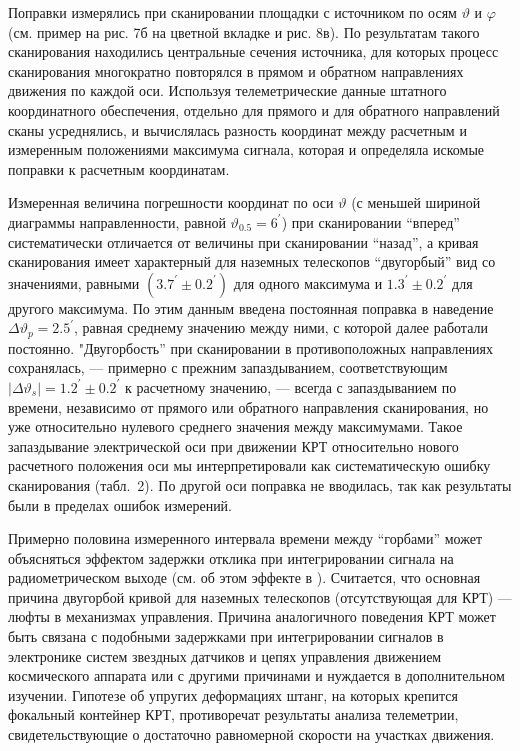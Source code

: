 Поправки измерялись при сканировании площадки с источником
по осям $\vartheta$ и $\varphi$ (см. пример на рис. 7б на цветной вкладке и рис. 8в).
По результатам такого сканирования находились центральные
сечения источника, для которых процесс сканирования многократно
повторялся в прямом и обратном направлениях движения по каждой оси.
Используя телеметрические данные штатного координатного обеспечения,
отдельно для прямого и для обратного направлений сканы
усреднялись, и вычислялась разность координат между расчетным и
измеренным положениями максимума сигнала, которая и определяла
искомые поправки к расчетным координатам.

Измеренная величина погрешности координат по оси $\vartheta$ (с меньшей шириной
диаграммы направленности, равной $\vartheta_{0.5} = 6^\prime$)
при сканировании ``вперед'' систематически отличается от величины
при сканировании ``назад'', а кривая сканирования имеет характерный для наземных
телескопов ``двугорбый'' вид  со значениями, равными $(3.7^\prime \pm 0.2^\prime)$
для одного максимума и $ 1.3^\prime \pm 0.2^\prime $    для другого максимума.
По этим данным введена постоянная поправка в наведение
$\Delta \vartheta_p = 2.5^\prime$,
равная среднему значению между ними, с которой далее  работали постоянно.
"Двугорбость'' при сканировании в противоположных направлениях сохранялась,
--- примерно с прежним запаздыванием, соответствующим
$\vert \Delta \vartheta_s \vert = 1.2^\prime \pm 0.2^\prime$ к расчетному значению, ---
всегда с запаздыванием по времени, независимо от прямого или обратного
направления сканирования, но уже относительно нулевого среднего значения
между максимумами. Такое запаздывание электрической оси при движении КРТ
относительно нового расчетного положения оси мы интерпретировали как
систематическую ошибку сканирования (табл.~2).
По другой оси поправка не вводилась, так как результаты
были в пределах ошибок измерений.

Примерно половина измеренного интервала времени между ``горбами''
может объясняться эффектом задержки отклика при интегрировании
сигнала на радиометрическом выходе (см. об этом эффекте в \cite{}).
Считается, что основная причина двугорбой кривой для наземных телескопов
(отсутствующая для КРТ) --- люфты в механизмах управления.
Причина аналогичного поведения КРТ может быть связана с подобными задержками
при интегрировании сигналов в электронике систем звездных датчиков и
цепях управления
движением космического аппарата или с другими причинами и нуждается в
дополнительном изучении.
Гипотезе об упругих деформациях штанг, на которых крепится фокальный контейнер
КРТ, противоречат результаты анализа телеметрии, свидетельствующие
о достаточно равномерной скорости на участках движения.

